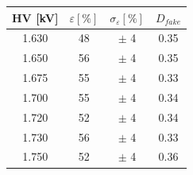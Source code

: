 \begin{tabular}{cccc}
\toprule
HV [kV] & $\varepsilon [\%]$ & $\sigma_{\varepsilon} [\%]$ & $D_{fake}$ \\
\midrule
1.630 & 48 & $\pm$ 4 & 0.35 \\
1.650 & 56 & $\pm$ 4 & 0.35 \\
1.675 & 55 & $\pm$ 4 & 0.33 \\
1.700 & 55 & $\pm$ 4 & 0.34 \\
1.720 & 52 & $\pm$ 4 & 0.34 \\
1.730 & 56 & $\pm$ 4 & 0.33 \\
1.750 & 52 & $\pm$ 4 & 0.36 \\
\bottomrule
\end{tabular}